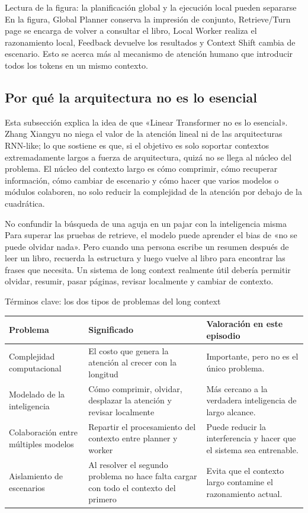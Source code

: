 \documentclass[a4paper]{article}
\begin{document}
\begin{knowledgebox}{Lectura de la figura: la planificación global y la ejecución local pueden separarse}
En la figura, Global Planner conserva la impresión de conjunto, Retrieve/Turn page se encarga de volver a consultar el libro, Local Worker realiza el razonamiento local, Feedback devuelve los resultados y Context Shift cambia de escenario. Esto se acerca más al mecanismo de atención humano que introducir todos los tokens en un mismo contexto.
\end{knowledgebox}

\subsection{Por qué la arquitectura no es lo esencial}

Esta subsección explica la idea de que «Linear Transformer no es lo esencial». Zhang Xiangyu no niega el valor de la atención lineal ni de las arquitecturas RNN-like; lo que sostiene es que, si el objetivo es solo soportar contextos extremadamente largos a fuerza de arquitectura, quizá no se llega al núcleo del problema. El núcleo del contexto largo es cómo comprimir, cómo recuperar información, cómo cambiar de escenario y cómo hacer que varios modelos o módulos colaboren, no solo reducir la complejidad de la atención por debajo de la cuadrática.

\begin{warningbox}{No confundir la búsqueda de una aguja en un pajar con la inteligencia misma}
Para superar las pruebas de retrieve, el modelo puede aprender el bias de «no se puede olvidar nada». Pero cuando una persona escribe un resumen después de leer un libro, recuerda la estructura y luego vuelve al libro para encontrar las frases que necesita. Un sistema de long context realmente útil debería permitir olvidar, resumir, pasar páginas, revisar localmente y cambiar de contexto.
\end{warningbox}

\begin{knowledgebox}{Términos clave: los dos tipos de problemas del long context}
\noindent\begin{tabularx}{\textwidth}{p{}p{}X}
\toprule
Problema & Significado & Valoración en este episodio \\
\midrule
Complejidad computacional & El costo que genera la atención al crecer con la longitud & Importante, pero no es el único problema. \\
Modelado de la inteligencia & Cómo comprimir, olvidar, desplazar la atención y revisar localmente & Más cercano a la verdadera inteligencia de largo alcance. \\
Colaboración entre múltiples modelos & Repartir el procesamiento del contexto entre planner y worker & Puede reducir la interferencia y hacer que el sistema sea entrenable. \\
Aislamiento de escenarios & Al resolver el segundo problema no hace falta cargar con todo el contexto del primero & Evita que el contexto largo contamine el razonamiento actual. \\
\bottomrule
\end{tabularx}
\end{knowledgebox}
\end{document}
